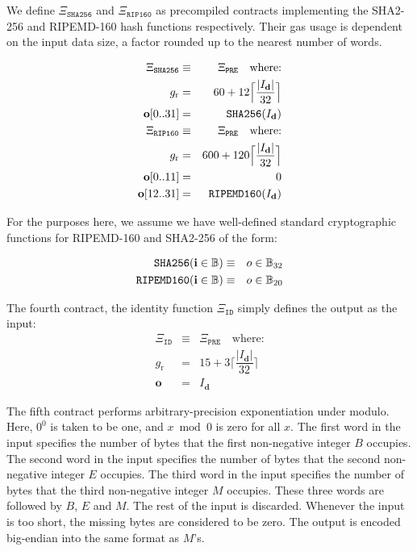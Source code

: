 \documentclass[9pt,oneside]{amsart}
\begin{document}
We define $\Xi_{\mathtt{SHA256}}$ and $\Xi_{\mathtt{RIP160}}$ as precompiled contracts implementing the SHA2-256 and RIPEMD-160 hash functions respectively. Their gas usage is dependent on the input data size, a factor rounded up to the nearest number of words.

\begin{eqnarray}
\Xi_{\mathtt{SHA256}} &\equiv& \Xi_{\mathtt{PRE}} \quad \text{where:} \\
g_{\mathrm{r}} &=& 60 + 12\Big\lceil \dfrac{|I_{\mathbf{d}}|}{32} \Big\rceil\\
\mathbf{o}[0..31] &=& \mathtt{\tiny SHA256}(I_{\mathbf{d}})\\
\Xi_{\mathtt{RIP160}} &\equiv& \Xi_{\mathtt{PRE}} \quad \text{where:} \\
g_{\mathrm{r}} &=& 600 + 120\Big\lceil \dfrac{|I_{\mathbf{d}}|}{32} \Big\rceil\\
\mathbf{o}[0..11] &=& 0 \\
\mathbf{o}[12..31] &=& \mathtt{\tiny RIPEMD160}(I_{\mathbf{d}})
\end{eqnarray}

For the purposes here, we assume we have well-defined standard cryptographic functions for RIPEMD-160 and SHA2-256 of the form:

\begin{eqnarray}
\mathtt{\small SHA256}(\mathbf{i} \in \mathbb{B}) & \equiv & o \in \mathbb{B}_{32} \\
\mathtt{\small RIPEMD160}(\mathbf{i} \in \mathbb{B}) & \equiv & o \in \mathbb{B}_{20}
\end{eqnarray}

The fourth contract, the identity function $\Xi_{\mathtt{ID}}$ simply defines the output as the input:
\begin{eqnarray}
\Xi_{\mathtt{ID}} &\equiv& \Xi_{\mathtt{PRE}} \quad \text{where:} \\
g_{\mathrm{r}} &=& 15 + 3\Big\lceil \dfrac{|I_{\mathbf{d}}|}{32} \Big\rceil\\
\mathbf{o} &=& I_{\mathbf{d}}
\end{eqnarray}

The fifth contract performs arbitrary-precision exponentiation under modulo. Here, $0 ^ 0$ is taken to be one, and $x \bmod 0$ is zero for all $x$. The first word in the input specifies the number of bytes that the first non-negative integer $B$ occupies. The second word in the input specifies the number of bytes that the second non-negative integer $E$ occupies. The third word in the input specifies the number of bytes that the third non-negative integer $M$ occupies. These three words are followed by $B$, $E$ and $M$. The rest of the input is discarded. Whenever the input is too short, the missing bytes are considered to be zero. The output is encoded big-endian into the same format as $M$'s.
\end{document}
